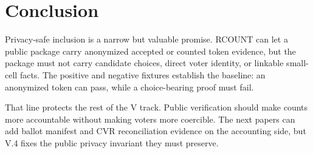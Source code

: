 \section{Conclusion}

Privacy-safe inclusion is a narrow but valuable promise. RCOUNT can let a public
package carry anonymized accepted or counted token evidence, but the package
must not carry candidate choices, direct voter identity, or linkable small-cell
facts. The positive and negative fixtures establish the baseline: an anonymized
token can pass, while a choice-bearing proof must fail.

That line protects the rest of the V track. Public verification should make
counts more accountable without making voters more coercible. The next papers
can add ballot manifest and CVR reconciliation evidence on the accounting side,
but V.4 fixes the public privacy invariant they must preserve.
